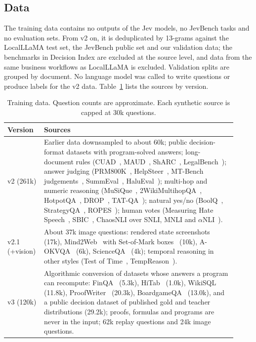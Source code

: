 \documentclass[10pt]{article}
\begin{document}
\subsection{Data}

The training data contains no outputs of the Jev models, no JevBench tasks and no evaluation sets.
From v2 on, it is deduplicated by 13-grams against the LocalLLaMA test set, the JevBench public set and our validation data; the benchmarks in Decision Index are excluded at the source level, and data from the same business workflows as LocalLLaMA is excluded.
Validation splits are grouped by document.
No language model was called to write questions or produce labels for the v2 data.
Table~\ref{tab:data} lists the sources by version.

\begin{table}[t]
\centering\small
\caption{Training data. Question counts are approximate. Each synthetic source is capped at 30k questions.}
\label{tab:data}
\begin{tabular}{p{0.12\linewidth}p{0.80\linewidth}}
\toprule
Version & Sources \\
\midrule
v2 (261k) & Earlier data downsampled to about 60k; public decision-format datasets with program-solved answers; long-document rules (CUAD~\cite{cuad}, MAUD~\cite{maud}, ShARC~\cite{sharc}, LegalBench~\cite{legalbench}); answer judging (PRM800K~\cite{prm800k}, HelpSteer~\cite{helpsteer}, MT-Bench judgements~\cite{mtbench}, SummEval~\cite{summeval}, HaluEval~\cite{halueval}); multi-hop and numeric reasoning (MuSiQue~\cite{musique}, 2WikiMultihopQA~\cite{wiki2}, HotpotQA~\cite{hotpot}, DROP~\cite{drop}, TAT-QA~\cite{tatqa}); natural yes/no (BoolQ~\cite{boolq}, StrategyQA~\cite{strategyqa}, ROPES~\cite{ropes}); human votes (Measuring Hate Speech~\cite{mhs}, SBIC~\cite{sbic}, ChaosNLI over SNLI, MNLI and $\alpha$NLI~\cite{chaosnli,snli,mnli,anli}). \\
v2.1 (+vision) & About 37k image questions: rendered state screenshots (17k), Mind2Web~\cite{mind2web} with Set-of-Mark boxes~\cite{som} (10k), A-OKVQA~\cite{aokvqa} (6k), ScienceQA~\cite{scienceqa} (4k); temporal reasoning in other styles (Test of Time~\cite{tot}, TempReason~\cite{tempreason}). \\
v3 (120k) & Algorithmic conversion of datasets whose answers a program can recompute: FinQA~\cite{finqa} (5.3k), HiTab~\cite{hitab} (1.0k), WikiSQL~\cite{wikisql} (11.8k), ProofWriter~\cite{proofwriter} (20.3k), BoardgameQA~\cite{boardgameqa} (13.0k), and a public decision dataset of published gold and teacher distributions (29.2k); proofs, formulas and programs are never in the input; 62k replay questions and 24k image questions. \\
\bottomrule
\end{tabular}
\end{table}
\end{document}
